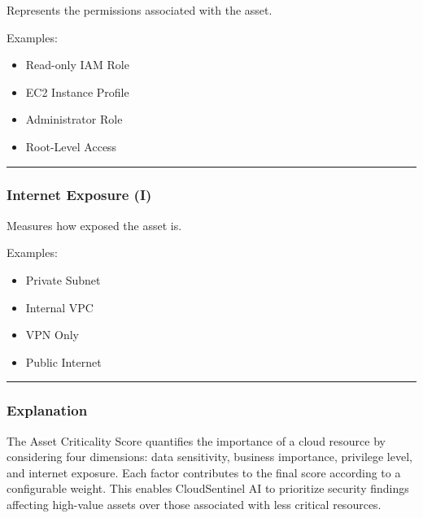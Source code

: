Represents the permissions associated with the asset.

Examples:

\begin{itemize}
\tightlist
\item
  Read-only IAM Role\\
\item
  EC2 Instance Profile\\
\item
  Administrator Role\\
\item
  Root-Level Access
\end{itemize}

\begin{center}\rule{0.5\linewidth}{0.5pt}\end{center}

\subsubsection{\texorpdfstring{\textbf{Internet Exposure (I)}}{Internet Exposure (I)}}

Measures how exposed the asset is.

Examples:

\begin{itemize}
\tightlist
\item
  Private Subnet\\
\item
  Internal VPC\\
\item
  VPN Only\\
\item
  Public Internet
\end{itemize}

\begin{center}\rule{0.5\linewidth}{0.5pt}\end{center}

\subsubsection{Explanation}

The Asset Criticality Score quantifies the importance of a cloud resource by considering four dimensions: data sensitivity, business importance, privilege level, and internet exposure. Each factor contributes to the final score according to a configurable weight. This enables CloudSentinel AI to prioritize security findings affecting high-value assets over those associated with less critical resources.

